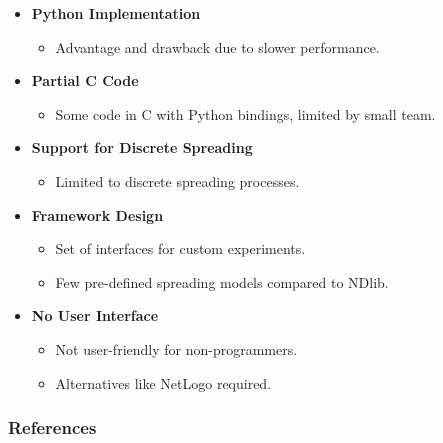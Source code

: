 \documentclass{beamer}
\begin{document}
\begin{frame}{\secname}
    \begin{itemize}
        \item \textbf{Python Implementation}
            \begin{itemize}
                \item Advantage and drawback due to slower performance.
            \end{itemize}
        \item \textbf{Partial C Code}
            \begin{itemize}
                \item Some code in C with Python bindings, limited by small team.
            \end{itemize}
        \item \textbf{Support for Discrete Spreading}
            \begin{itemize}
                \item Limited to discrete spreading processes.
            \end{itemize}
        \item \textbf{Framework Design}
            \begin{itemize}
                \item Set of interfaces for custom experiments.
                \item Few pre-defined spreading models compared to NDlib.
            \end{itemize}
        \item \textbf{No User Interface}
            \begin{itemize}
                \item Not user-friendly for non-programmers.
                \item Alternatives like NetLogo required.
            \end{itemize}
    \end{itemize}
\end{frame}

\begin{frame}[allowframebreaks]
    \frametitle{References}
    
    
\end{frame}

\addtocounter{framenumber}{1}
\end{document}
